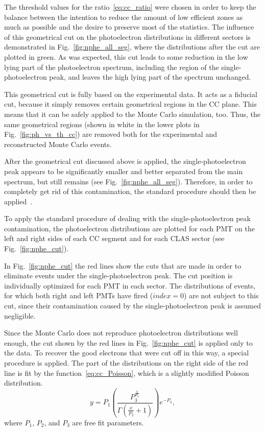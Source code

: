 The threshold values for the ratio~\eqref{eq:cc_ratio} were chosen in order to keep the balance between the intention to reduce the amount of low efficient zones as much as possible and the desire to preserve most of the statistics. The influence of this geometrical cut on the photoelectron distributions in different sectors is demonstrated in Fig.~\ref{fig:nphe_all_seg}, where the distributions after the cut are plotted in green. As was expected, this cut leads to some reduction in the low lying part of the photoelectron spectrum, including the region of the single-photoelectron peak, and leaves the high lying part of the spectrum unchanged.


This geometrical cut is fully based on the experimental data. It acts as a fiducial cut, because it simply removes certain geometrical regions in the CC plane. This means that it can be safely applied to the Monte Carlo simulation, too. Thus, the same geometrical regions (shown in white in the lower plots in Fig.~\ref{fig:ph_vs_th_cc}) are removed both for the experimental and reconstructed Monte Carlo events.


After the geometrical cut discussed above is applied, the single-photoelectron peak appears to be significantly smaller and better separated from the main spectrum, but still remains (see Fig.~\ref{fig:nphe_all_seg}). Therefore, in order to completely get rid of this contamination, the standard procedure should then be applied~\cite{Fed_an_note:2007}. 


To apply the standard procedure of dealing with the single-photoelectron peak contamination, the photoelectron distributions are plotted for each PMT on the left and right sides of each CC segment and for each CLAS sector (see Fig.~\ref{fig:nphe_cut}). 


In Fig.~\ref{fig:nphe_cut} the red lines show the cuts that are made in order to eliminate events under the single-photoelectron peak. The cut position is individually optimized for each PMT in each sector. The distributions of events, for which both right and left PMTs have fired ($index = 0$) are not subject to this cut, since their contamination caused by the single-photoelectron peak is assumed negligible.


Since the Monte Carlo does not reproduce photoelectron distributions well enough, the cut shown by the red lines in Fig.~\ref{fig:nphe_cut} is applied only to the data. To recover the good electrons that were cut off in this way, a special procedure is applied. The part of the distributions on the right side of the red line is fit by the function~\eqref{eq:cc_Poisson}, which is a slightly modified Poisson distribution. 
\begin{equation}
y = P_{1}\left(\frac{P_{3}^{\frac{x}{P_{2}}}}{\Gamma\left(\frac{x}{P_{2}}+1\right)}
\right)e^{-P_{3}},
\label{eq:cc_Poisson}
\end{equation}
where $P_{1}$, $P_{2}$, and $P_{3}$ are free fit parameters.



